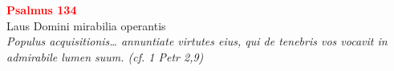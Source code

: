 


\def\greinitialformat#1{%
{\fontsize{39}{39}\selectfont #1}%
}




\vspace{0.3cm}
\begin{center}
 \textcolor{red}{\large \bf Psalmus 134}\\
Laus Domini mirabilia operantis\\
\textit{\small Populus acquisitionis… annuntiate virtutes eius, qui de tenebris vos vocavit in admirabile lumen suum. (cf. 1 Petr 2,9)}
\end{center}
